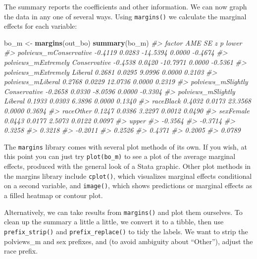 \documentclass[]{book}
\newenvironment{Shaded}{\begin{snugshade}}{\end{snugshade}}
\newcommand{\CommentTok}[1]{\textcolor[rgb]{0.56,0.35,0.01}{\textit{#1}}}
\newcommand{\KeywordTok}[1]{\textcolor[rgb]{0.13,0.29,0.53}{\textbf{#1}}}
\newcommand{\NormalTok}[1]{#1}
\newcommand{\StringTok}[1]{\textcolor[rgb]{0.31,0.60,0.02}{#1}}
\begin{document}
The summary reports the coefficients and other information. We can now graph the data in any one of several ways. Using \texttt{margins()} we calculate the marginal effects for each variable:

\begin{Shaded}
\begin{Highlighting}[]
\NormalTok{bo_m <-}\StringTok{ }\KeywordTok{margins}\NormalTok{(out_bo)}
\KeywordTok{summary}\NormalTok{(bo_m)}
\CommentTok{#>                            factor     AME     SE        z      p   lower}
\CommentTok{#>            polviews_mConservative -0.4119 0.0283 -14.5394 0.0000 -0.4674}
\CommentTok{#>  polviews_mExtremely Conservative -0.4538 0.0420 -10.7971 0.0000 -0.5361}
\CommentTok{#>       polviews_mExtremely Liberal  0.2681 0.0295   9.0996 0.0000  0.2103}
\CommentTok{#>                 polviews_mLiberal  0.2768 0.0229  12.0736 0.0000  0.2319}
\CommentTok{#>   polviews_mSlightly Conservative -0.2658 0.0330  -8.0596 0.0000 -0.3304}
\CommentTok{#>        polviews_mSlightly Liberal  0.1933 0.0303   6.3896 0.0000  0.1340}
\CommentTok{#>                         raceBlack  0.4032 0.0173  23.3568 0.0000  0.3694}
\CommentTok{#>                         raceOther  0.1247 0.0386   3.2297 0.0012  0.0490}
\CommentTok{#>                         sexFemale  0.0443 0.0177   2.5073 0.0122  0.0097}
\CommentTok{#>    upper}
\CommentTok{#>  -0.3564}
\CommentTok{#>  -0.3714}
\CommentTok{#>   0.3258}
\CommentTok{#>   0.3218}
\CommentTok{#>  -0.2011}
\CommentTok{#>   0.2526}
\CommentTok{#>   0.4371}
\CommentTok{#>   0.2005}
\CommentTok{#>   0.0789}
\end{Highlighting}
\end{Shaded}

The \texttt{margins} library comes with several plot methods of its own. If you wish, at this point you can just try \texttt{plot(bo\_m)} to see a plot of the average marginal effects, produced with the general look of a Stata graphic. Other plot methods in the margins library include \texttt{cplot()}, which visualizes marginal effects conditional on a second variable, and \texttt{image()}, which shows predictions or marginal effects as a filled heatmap or contour plot.

Alternatively, we can take results from \texttt{margins()} and plot them ourselves. To clean up the summary a little a little, we convert it to a tibble, then use \texttt{prefix\_strip()} and \texttt{prefix\_replace()} to tidy the labels. We want to strip the polviews\_m and sex prefixes, and (to avoid ambiguity about ``Other''), adjust the race prefix.
\end{document}
